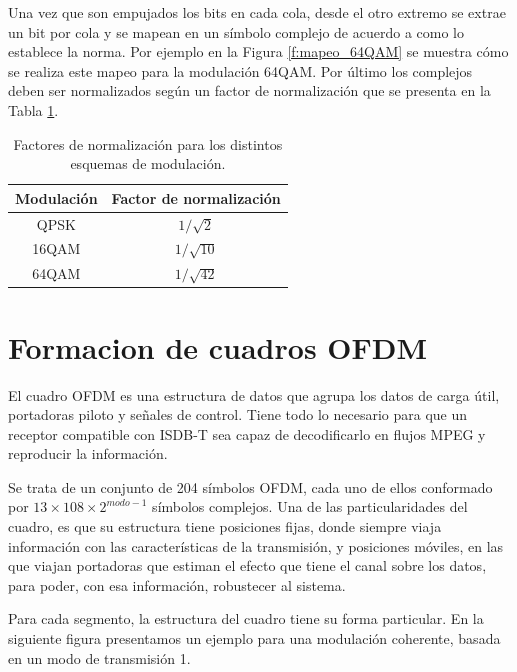 Una vez que son empujados los bits en cada cola, desde el otro extremo se extrae un bit por cola y se mapean en un s\'imbolo complejo de acuerdo a como lo establece la norma. Por ejemplo en la Figura \ref{f:mapeo_64QAM} se muestra c\'omo se realiza este mapeo para la modulaci\'on 64QAM. Por \'ultimo los complejos deben ser normalizados seg\'un un factor de normalizaci\'on que se presenta en la Tabla \ref{t:factor_normalizacion}.

\begin{table}[h!]
\centering
\begin{tabular}{|c|c|}
\hline
\textbf{Modulaci\'on} 				& \textbf{Factor de normalizaci\'on}\\
\hline
QPSK 		& $1/ \sqrt{2}$\\
\hline
16QAM		& $1/ \sqrt{10}$ \\
\hline
64QAM 		& $1/ \sqrt{42}$ \\
\hline
\end{tabular}
\caption{\label{t:factor_normalizacion} Factores de normalizaci\'on para los distintos esquemas de modulaci\'on.}
\end{table}


\section{Formacion de cuadros OFDM}
El cuadro OFDM es una estructura de datos que agrupa los datos de carga \'util, portadoras piloto y señales de control. Tiene todo lo necesario para que un receptor compatible con ISDB-T sea capaz de decodificarlo en flujos MPEG y reproducir la informaci\'on.

Se trata de un conjunto de 204 s\'imbolos OFDM, cada uno de ellos conformado por $13 \times 108 \times 2^{modo -1}$ s\'imbolos complejos. Una de las particularidades del cuadro, es que su estructura tiene posiciones fijas, donde siempre viaja información con las características de la transmisión, y posiciones móviles, en las que viajan portadoras que estiman el efecto que tiene el canal sobre los datos, para poder, con esa información, robustecer al sistema. 

Para cada segmento, la estructura del cuadro tiene su forma particular. En la siguiente figura presentamos un ejemplo para una modulación coherente, basada en un modo de transmisión 1.

